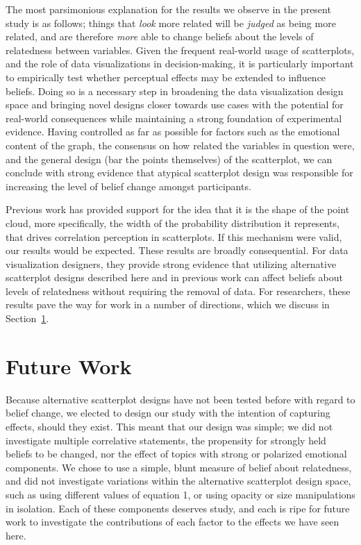 \documentclass[manuscript,screen,review,anonymous]{acmart}
\begin{document}
The most parsimonious explanation for the results we observe in the
present study is as follows; things that \emph{look} more related will
be \emph{judged} as being more related, and are therefore \emph{more}
able to change beliefs about the levels of relatedness between
variables. Given the frequent real-world usage of scatterplots, and the
role of data visualizations in decision-making, it is particularly
important to empirically test whether perceptual effects may be extended
to influence beliefs. Doing so is a necessary step in broadening the
data visualization design space and bringing novel designs closer
towards use cases with the potential for real-world consequences while
maintaining a strong foundation of experimental evidence. Having
controlled as far as possible for factors such as the emotional content
of the graph, the consensus on how related the variables in question
were, and the general design (bar the points themselves) of the
scatterplot, we can conclude with strong evidence that atypical
scatterplot design was responsible for increasing the level of belief
change amongst participants.

Previous work has provided support for the idea that it is the shape of
the point cloud, more specifically, the width of the probability
distribution it represents, that drives correlation perception in
scatterplots. If this mechanism were valid, our results would be
expected. These results are broadly consequential. For data
visualization designers, they provide strong evidence that utilizing
alternative scatterplot designs described here and in previous work can
affect beliefs about levels of relatedness without requiring the removal
of data. For researchers, these results pave the way for work in a
number of directions, which we discuss in Section~\ref{sec-future-work}.

\section{Future Work}\label{sec-future-work}

Because alternative scatterplot designs have not been tested before with
regard to belief change, we elected to design our study with the
intention of capturing effects, should they exist. This meant that our
design was simple; we did not investigate multiple correlative
statements, the propensity for strongly held beliefs to be changed, nor
the effect of topics with strong or polarized emotional components. We
chose to use a simple, blunt measure of belief about relatedness, and
did not investigate variations within the alternative scatterplot design
space, such as using different values of equation 1, or using opacity or
size manipulations in isolation. Each of these components deserves
study, and each is ripe for future work to investigate the contributions
of each factor to the effects we have seen here.
\end{document}
